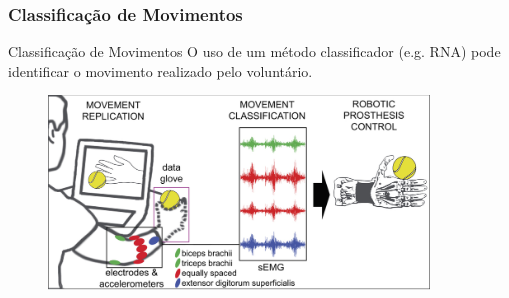 \documentclass{beamer}
\begin{document}
	\begin{frame}
		\frametitle{Classificação de Movimentos}
		
		\begin{exampleblock}{Classificação de Movimentos}
			O uso de um método classificador (e.g. RNA) pode identificar o movimento realizado pelo voluntário.
		\end{exampleblock}
		
		\begin{figure}
			\begin{center}
				\includegraphics[width=0.9\textwidth]{./img/classificationExample.jpg}
			\end{center}
		\end{figure}
		
	\end{frame}
	
\end{document}
